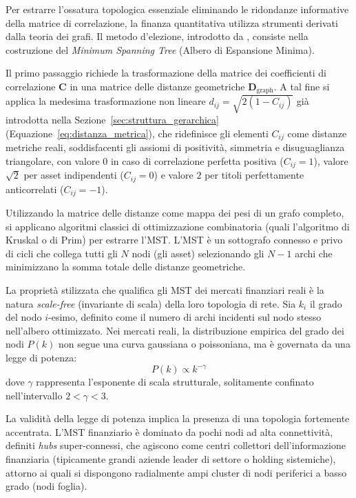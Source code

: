 Per estrarre l'ossatura topologica essenziale eliminando le ridondanze informative della matrice di correlazione, la finanza quantitativa utilizza strumenti derivati dalla teoria dei grafi. Il metodo d'elezione, introdotto da \citet{mantegna1998hierarchical}, consiste nella costruzione del \emph{Minimum Spanning Tree} (Albero di Espansione Minima).

Il primo passaggio richiede la trasformazione della matrice dei coefficienti di correlazione $\mathbf{C}$ in una matrice delle distanze geometriche $\mathbf{D}_{\text{graph}}$. A tal fine si applica la medesima trasformazione non lineare $d_{ij} = \sqrt{2(1 - C_{ij})}$ già introdotta nella Sezione~\ref{sec:struttura_gerarchica} (Equazione~\eqref{eq:distanza_metrica}), che ridefinisce gli elementi $C_{ij}$ come distanze metriche reali, soddisfacenti gli assiomi di positività, simmetria e disuguaglianza triangolare, con valore $0$ in caso di correlazione perfetta positiva ($C_{ij}=1$), valore $\sqrt{2}$ per asset indipendenti ($C_{ij}=0$) e valore $2$ per titoli perfettamente anticorrelati ($C_{ij}=-1$).

Utilizzando la matrice delle distanze come mappa dei pesi di un grafo completo, si applicano algoritmi classici di ottimizzazione combinatoria (quali l'algoritmo di Kruskal o di Prim) per estrarre l'MST. L'MST è un sottografo connesso e privo di cicli che collega tutti gli $N$ nodi (gli asset) selezionando gli $N-1$ archi che minimizzano la somma totale delle distanze geometriche.

La proprietà stilizzata che qualifica gli MST dei mercati finanziari reali è la natura \emph{scale-free} (invariante di scala) della loro topologia di rete. Sia $k_i$ il grado del nodo $i$-esimo, definito come il numero di archi incidenti sul nodo stesso nell'albero ottimizzato. Nei mercati reali, la distribuzione empirica del grado dei nodi $P(k)$ non segue una curva gaussiana o poissoniana, ma è governata da una legge di potenza:
\begin{equation}
P(k) \propto k^{-\gamma}
\end{equation}
dove $\gamma$ rappresenta l'esponente di scala strutturale, solitamente confinato nell'intervallo $2 < \gamma < 3$.

La validità della legge di potenza implica la presenza di una topologia fortemente accentrata. L'MST finanziario è dominato da pochi nodi ad alta connettività, definiti \emph{hubs} super-connessi, che agiscono come centri collettori dell'informazione finanziaria (tipicamente grandi aziende leader di settore o holding sistemiche), attorno ai quali si dispongono radialmente ampi cluster di nodi periferici a basso grado (nodi foglia).

